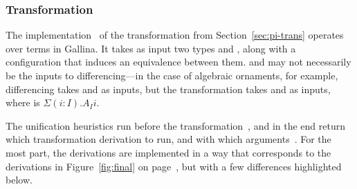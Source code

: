 \subsubsection{Transformation}
\label{sec:pi-details-trans}

The implementation~\href{https://github.com/uwplse/pumpkin-pi/blob/v2.0.0/plugin/src/automation/lift/lift.ml}{}
of the transformation from Section~\ref{sec:pi-trans} operates over terms in Gallina.
It takes as input two types \Aa and \B, along with a configuration that induces an equivalence between them.
\Aa and \B may not necessarily be the inputs to differencing---in the case of algebraic ornaments, for example,
differencing takes \Aa and \AI as inputs, but the transformation takes \Aa and \B as inputs,
where \B is $\Sigma (i : I).A_I i$.

The unification heuristics run before the transformation~\href{https://github.com/uwplse/pumpkin-pi/blob/v2.0.0/plugin/src/automation/lift/liftconfig.ml}{},
and in the end return which transformation derivation to run,
and with which arguments~\href{https://github.com/uwplse/pumpkin-pi/blob/v2.0.0/plugin/src/automation/lift/liftrules.ml}{}.
For the most part, the derivations are implemented in a way that corresponds to the derivations in Figure~\ref{fig:final}
on page~\pageref{fig:final}, but with a few differences highlighted below.

